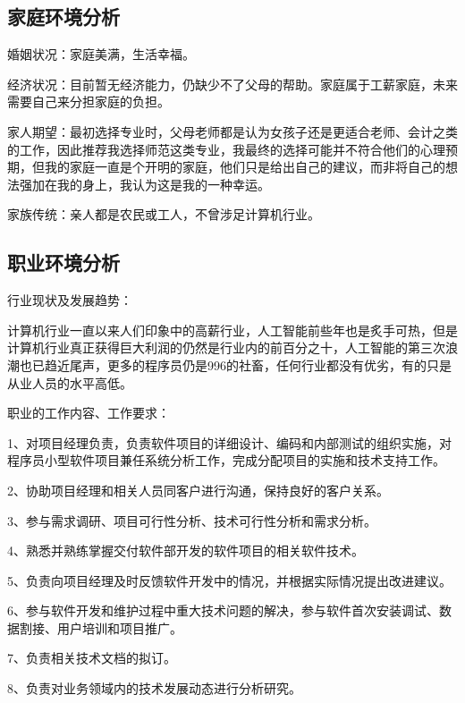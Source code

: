 \documentclass{article}
\begin{document}
\subsection{家庭环境分析}
婚姻状况：家庭美满，生活幸福。\par
经济状况：目前暂无经济能力，仍缺少不了父母的帮助。家庭属于工薪家庭，未来需要自己来分担家庭的负担。\par
家人期望：最初选择专业时，父母老师都是认为女孩子还是更适合老师、会计之类的工作，因此推荐我选择师范这类专业，我最终的选择可能并不符合他们的心理预期，但我的家庭一直是个开明的家庭，他们只是给出自己的建议，而非将自己的想法强加在我的身上，我认为这是我的一种幸运。\par
家族传统：亲人都是农民或工人，不曾涉足计算机行业。\par
\subsection{职业环境分析}
行业现状及发展趋势：\par
计算机行业一直以来人们印象中的高薪行业，人工智能前些年也是炙手可热，但是计算机行业真正获得巨大利润的仍然是行业内的前百分之十，人工智能的第三次浪潮也已趋近尾声，更多的程序员仍是996的社畜，任何行业都没有优劣，有的只是从业人员的水平高低。\par
职业的工作内容、工作要求：\par
1、对项目经理负责，负责软件项目的详细设计、编码和内部测试的组织实施，对程序员小型软件项目兼任系统分析工作，完成分配项目的实施和技术支持工作。\par
2、协助项目经理和相关人员同客户进行沟通，保持良好的客户关系。\par
3、参与需求调研、项目可行性分析、技术可行性分析和需求分析。\par
4、熟悉并熟练掌握交付软件部开发的软件项目的相关软件技术。\par
5、负责向项目经理及时反馈软件开发中的情况，并根据实际情况提出改进建议。\par
6、参与软件开发和维护过程中重大技术问题的解决，参与软件首次安装调试、数据割接、用户培训和项目推广。\par
7、负责相关技术文档的拟订。\par
8、负责对业务领域内的技术发展动态进行分析研究。\par
\end{document}
